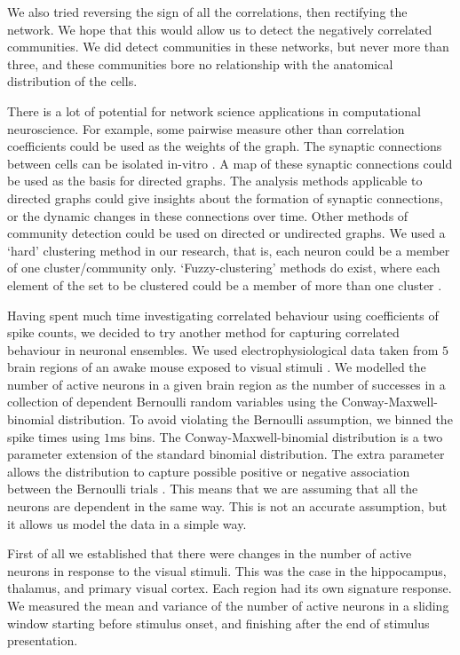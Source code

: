 We also tried reversing the sign of all the correlations, then rectifying the network. We hope that this would allow us to detect the negatively correlated communities. We did detect communities in these networks, but never more than three, and these communities bore no relationship with the anatomical distribution of the cells.

There is a lot of potential for network science applications in computational neuroscience. For example, some pairwise measure other than correlation coefficients could be used as the weights of the graph. The synaptic connections between cells can be isolated in-vitro \parencite{okun}. A map of these synaptic connections could be used as the basis for directed graphs. The analysis methods applicable to directed graphs could give insights about the formation of synaptic connections, or the dynamic changes in these connections over time. Other methods of community detection could be used on directed or undirected graphs. We used a `hard' clustering method in our research, that is, each neuron could be a member of one cluster/community only. `Fuzzy-clustering' methods do exist, where each element of the set to be clustered could be a member of more than one cluster \parencite{baadel}.

Having spent much time investigating correlated behaviour using coefficients of spike counts, we decided to try another method for capturing correlated behaviour in neuronal ensembles. We used electrophysiological data taken from $5$ brain regions of an awake mouse exposed to visual stimuli \parencite{steinmetz2019}. We modelled the number of active neurons in a given brain region as the number of successes in a collection of dependent Bernoulli random variables using the Conway-Maxwell-binomial distribution. To avoid violating the Bernoulli assumption, we binned the spike times using $1$ms bins. The Conway-Maxwell-binomial distribution is a two parameter extension of the standard binomial distribution. The extra parameter allows the distribution to capture possible positive or negative association between the Bernoulli trials \parencite{kadane_2016}. This means that we are assuming that all the neurons are dependent in the same way. This is not an accurate assumption, but it allows us model the data in a simple way.

First of all we established that there were changes in the number of active neurons in response to the visual stimuli. This was the case in the hippocampus, thalamus, and primary visual cortex. Each region had its own signature response. We measured the mean and variance of the number of active neurons in a sliding window starting before stimulus onset, and finishing after the end of stimulus presentation.

